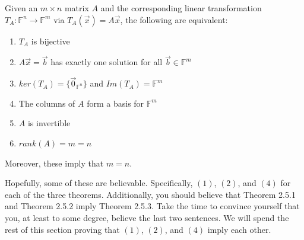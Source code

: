 \begin{theorem}
    Given an $m\times n$ matrix $A$ and the corresponding linear transformation $T_A:\mathbb{F}^n\to\mathbb{F}^m$ via $T_A(\vec{x})=A\vec{x}$, the following are equivalent:
    \begin{enumerate}
        \item $T_A$ is bijective
        \item $A\vec{x}=\vec{b}$ has exactly one solution for all $\vec{b}\in\mathbb{F}^m$
        \item $ker(T_A)=\{\vec{0}_{\mathbb{F}^n}\}$ and $Im(T_A)=\mathbb{F}^m$
        \item The columns of $A$ form a basis for $\mathbb{F}^m$
        \item $A$ is invertible
        \item $rank(A)=m=n$
    \end{enumerate}
    Moreover, these imply that $m=n$.
\end{theorem}
Hopefully, some of these are believable. Specifically, $(1)$, $(2)$, and $(4)$ for each of the three theorems. Additionally, you should believe that Theorem 2.5.1 and Theorem 2.5.2 imply Theorem 2.5.3. Take the time to convince yourself that you, at least to some degree, believe the last two sentences. We will spend the rest of this section proving that $(1)$, $(2)$, and $(4)$ imply each other.

